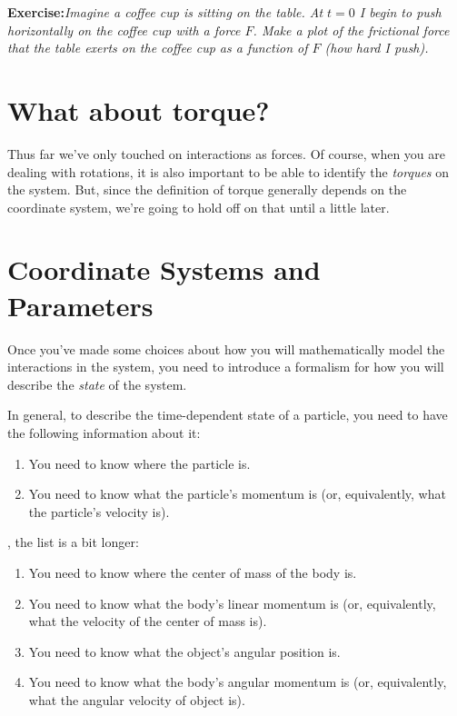 \documentclass{tufte-handout}
\begin{document}
{\bf Exercise:}{\it Imagine a coffee cup is sitting on the table.  At $t=0$ I begin to push horizontally on the coffee cup with a force $F$.  Make a plot of the frictional force that the table exerts on the coffee cup as a function of $F$ (how hard I push).}

\section{What about torque?}

Thus far we've only touched on interactions as forces.  Of course, when you are dealing with rotations, it is also important to be able to identify the {\it torques} on the system.  But, since the definition of torque generally depends on the coordinate system, we're going to hold off on that until a little later. 


\section{Coordinate Systems and Parameters}
Once you've made some choices about how you will mathematically model the interactions in the system, you need to introduce a formalism for how you will describe the {\it state} of the system.  

In general, to describe the time-dependent state of a particle, you need to have the following information about it:

\begin{enumerate}
\item You need to know where the particle is.
\item You need to know what the particle's momentum is (or, equivalently, what the particle's velocity is).
\end{enumerate}

, the list is a bit longer:
\begin{enumerate}
\item You need to know where the center of mass of the body is.
\item You need to know what the body's linear momentum is (or, equivalently, what the velocity of the center of mass is).
\item You need to know what the object's angular position is.
\item You need to know what the body's angular momentum is (or, equivalently, what the angular velocity of object is).
\end{enumerate}
\end{document}
